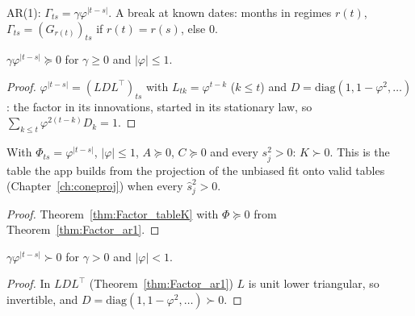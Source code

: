\begin{definition}\label{def:Factor_ar1}
  \leanok
  AR(1): $\Gamma_{ts} = \gamma\varphi^{|t-s|}$. A break at known dates: months in regimes
  $r(t)$, $\Gamma_{ts} = (G_{r(t)})_{ts}$ if $r(t) = r(s)$, else $0$.
\end{definition}

\begin{theorem}\label{thm:Factor_ar1}
  \leanok
  $\gamma\varphi^{|t-s|} \succeq 0$ for $\gamma \ge 0$ and $|\varphi| \le 1$.
\end{theorem}
\begin{proof}
  \leanok
  $\varphi^{|t-s|} = (LDL^\top)_{ts}$ with $L_{tk} = \varphi^{t-k}$ ($k \le t$) and
  $D = \mathrm{diag}(1, 1-\varphi^2, \dots)$: the factor in its innovations, started in its
  stationary law, so $\sum_{k \le t}\varphi^{2(t-k)}D_k = 1$.
\end{proof}

\begin{corollary}\label{cor:Factor_tableK_ar1}
  \leanok
  With $\Phi_{ts} = \varphi^{|t-s|}$, $|\varphi| \le 1$, $A \succeq 0$, $C \succeq 0$ and every
  $s_j^2 > 0$: $\hat K \succ 0$. This is the table the app builds from the projection of the
  unbiased fit onto valid tables (Chapter~\ref{ch:coneproj}) when every $\hat s_j^2 > 0$.
\end{corollary}
\begin{proof}
  \leanok
  Theorem~\ref{thm:Factor_tableK} with $\Phi \succeq 0$ from Theorem~\ref{thm:Factor_ar1}.
\end{proof}

\begin{lemma}\label{lem:Factor_ar1_posDef}
  \leanok
  $\gamma\varphi^{|t-s|} \succ 0$ for $\gamma > 0$ and $|\varphi| < 1$.
\end{lemma}
\begin{proof}
  \leanok
  In $LDL^\top$ (Theorem~\ref{thm:Factor_ar1}) $L$ is unit lower triangular, so invertible,
  and $D = \mathrm{diag}(1, 1-\varphi^2, \dots) \succ 0$.
\end{proof}

